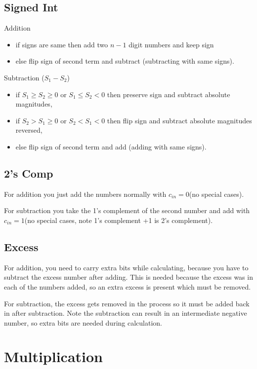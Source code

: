 \subsection{Signed Int}

Addition
\begin{itemize}
    \item if signs are same then add two $n-1$ digit numbers and keep sign
    \item else flip sign of second term and subtract (subtracting with same signs).
\end{itemize}

\noindent
Subtraction ($S_1-S_2$)
\begin{itemize}
    \item if $S_1 \ge S_2 \ge 0$ or $S_1 \le S_2 < 0$ then preserve sign and subtract absolute magnitudes,
    \item if $S_2 > S_1 \ge 0$ or $S_2 < S_1 < 0$ then flip sign and subtract absolute magnitudes reversed,
    \item else flip sign of second term and add (adding with same signs).
\end{itemize}

\subsection{2's Comp}

For addition you just add the numbers normally with $c_{in}=0$(no special cases).

For subtraction you take the 1's complement of the second number and add with $c_{in}=1$(no special cases, note 1's complement +1 is 2's complement).

\subsection{Excess}

For addition, you need to carry extra bits while calculating, because you have to subtract the excess number after adding.  This is needed because the excess was in each of the numbers added, so an extra excess is present which must be removed.

For subtraction, the excess gets removed in the process so it must be added back in after subtraction.  Note the subtraction can result in an intermediate negative number, so extra bits are needed during calculation.

\section{Multiplication}

